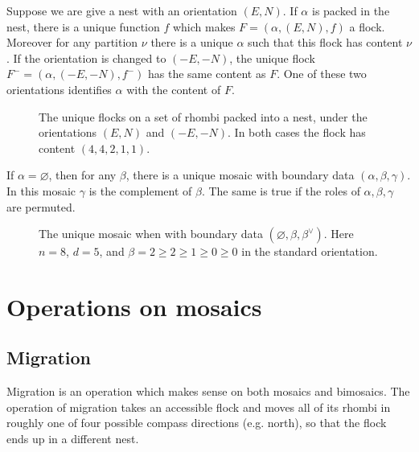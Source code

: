 \begin{lemma}
\label{lem:uniqueflock}
Suppose we are give a nest with an orientation $(E,N)$.
If $\alpha$ is packed in the nest, there is a unique function $f$ 
which makes $F = (\alpha, (E,N), f)$ a flock. 
Moreover for any partition
$\nu$ there is a unique $\alpha$ such that this flock has content
$\nu$.  If the orientation is changed to $(-E,-N)$, the unique flock 
$F^- = (\alpha, (-E,-N), f^-)$ has the same content as $F$.  One
of these two orientations identifies $\alpha$ with the content of $F$.
\end{lemma}

%
\begin{figure}[htbp]
\begin{center}
\caption{The unique flocks on a set of rhombi packed into a nest,
under the orientations $(E,N)$ and $(-E,-N)$.  In both cases
the flock has content $(4,4,2,1,1)$.}
\label{fig:canonicalflock}
\end{center}
\end{figure}
%

\begin{lemma}
\label{lem:uniquemosaic}
If $\alpha = \varnothing$, then for any $\beta$, there is a unique
mosaic with boundary data $(\alpha, \beta, \gamma)$.  In this
mosaic $\gamma$ is the complement of $\beta$. 
The same is true if the roles of $\alpha, \beta, \gamma$ are
permuted.
\end{lemma}

%
\begin{figure}[htbp]
\begin{center}
\caption{The unique mosaic when with boundary data 
$(\varnothing, \beta, \beta^\vee)$. Here $n=8$, $d=5$, and 
$\beta = 2 \geq 2 \geq 1 \geq 0 \geq 0$ in the standard orientation.}
\label{fig:canonicalmosaic}
\end{center}
\end{figure}
%


\section{Operations on mosaics}
\label{sec:operations}
\subsection{Migration}
Migration is an operation which makes sense on both mosaics and 
bimosaics.  The operation of migration takes an accessible flock and
moves all of its rhombi in roughly one of four possible compass
directions (e.g. north), so that the flock ends up in a different nest.

